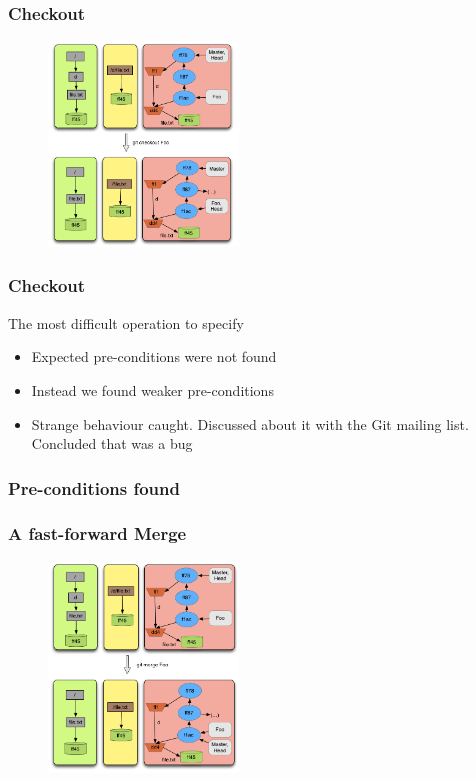 \documentclass{beamer}
\begin{document}
\begin{frame}[fragile]
   \frametitle{Checkout}
   \begin{figure}
      \centering
      \includegraphics[width=0.45\textwidth]{images/checkout.png}
   \end{figure}
\end{frame}

\begin{frame}[fragile]
	\frametitle{Checkout}
	\begin{block}{The most difficult operation to specify}
	\begin{itemize}
		\item Expected pre-conditions were not found
		\item Instead we found weaker pre-conditions
		\item Strange behaviour caught. Discussed about it 
		with the Git mailing list. Concluded that was a bug
	\end{itemize}
	\end{block}
\end{frame}

\begin{frame}[fragile]
   \frametitle{Pre-conditions found}
\end{frame}

\begin{frame}[fragile]
   \frametitle{ A fast-forward Merge}
   \begin{figure}
      \centering
      \includegraphics[width=0.45\textwidth]{images/fastforwardmerge.png}
   \end{figure}
\end{frame}
\end{document}
